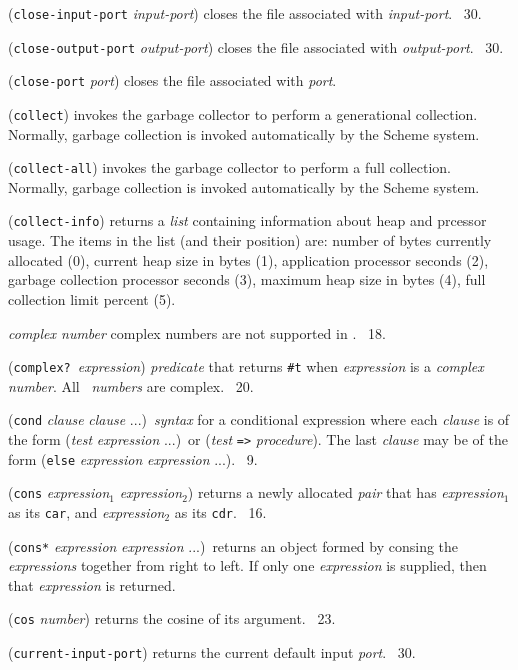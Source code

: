 \documentclass[10pt,twocolumn]{article}
\begin{document}
(\texttt{close-input-port} \emph{input-port}) closes the file
associated with \emph{input-port}. \RRRRRS~30.

(\texttt{close-output-port} \emph{output-port}) closes the file
associated with \emph{output-port}.  \RRRRRS~30.

(\texttt{close-port} \emph{port}) closes the file associated with
\emph{port}.

(\texttt{collect}) invokes the garbage collector to perform a
generational collection.  Normally, garbage collection is invoked
automatically by the Scheme system.

(\texttt{collect-all}) invokes the garbage collector to perform a full
collection.  Normally, garbage collection is invoked automatically by
the Scheme system.

(\texttt{collect-info}) returns a \emph{list} containing information
about heap and prcessor usage.  The items in the list (and their
position) are: number of bytes currently allocated (0), current heap
size in bytes (1), application processor seconds (2), garbage
collection processor seconds (3), maximum heap size in bytes (4), full
collection limit percent (5).

\emph{complex number} complex numbers are not supported in \StoC.
\RRRRRS~18.

(\texttt{complex?}\ \emph{expression}) \emph{predicate} that returns
\texttt{\#t} when \emph{expression} is a \emph{complex number}.  All
\StoC\ \emph{numbers} are complex. \RRRRRS~20.

(\texttt{cond} \emph{clause} \emph{clause} ...)\ \emph{syntax} for a
conditional expression where each \emph{clause} is of the form
(\emph{test} \emph{expression} ...)\ or (\emph{test} \texttt{=>}
\emph{procedure}).  The last \emph{clause} may be of the form
(\texttt{else} \emph{expression} \emph{expression} ...).  \RRRRRS~9.

(\texttt{cons} \emph{expression}$_1$ \emph{expression}$_2$) returns a
newly allocated \emph{pair} that has \emph{expression}$_1$ as its
\texttt{car}, and \emph{expression}$_2$ as its
\texttt{cdr}. \RRRRRS~16.

(\texttt{cons*} \emph{expression} \emph{expression} ...)\ returns an
object formed by consing the \emph{expressions} together from right to
left. If only one \emph{expression} is supplied, then that
\emph{expression} is returned.

(\texttt{cos} \emph{number}) returns the cosine of its argument.
\RRRRRS~23.

(\texttt{current-input-port}) returns the current default input
\emph{port}.  \RRRRRS~30.
\end{document}

